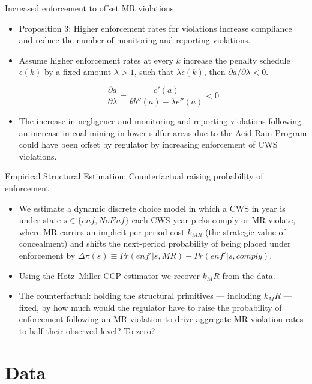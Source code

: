 \documentclass{beamer}
\begin{document}
\begin{frame}{Increased enforcement to offset MR violations}
\begin{itemize}
\item Proposition 3: Higher enforcement rates for violations increase compliance and reduce the number of monitoring and reporting violations. 
\item Assume higher enforcement rates at every $k$ increase the penalty schedule $\epsilon(k)$ by a fixed amount $\lambda>1$, such that $\lambda\epsilon(k)$, then $\partial a/\partial \lambda<0$.

\[\frac{\partial a}{\partial \lambda}=\frac{e'(a)}{\theta b''(a)-\lambda e''(a)}<0\]

\item The increase in negligence and monitoring and reporting violations following an increase in coal mining in lower sulfur areas due to the Acid Rain Program could have been offset by regulator by increasing enforcement of CWS violations.
\end{itemize}
\end{frame}

\begin{frame}{Empirical Structural Estimation: Counterfactual raising probability of enforcement}
\begin{itemize}
\item We estimate a dynamic discrete choice model in which a CWS in year is under state $s\in \{enf,NoEnf\}$ each CWS-year picks comply or MR-violate, where MR carries an implicit per-period cost $k_{MR}$ (the strategic value of concealment) and shifts the next-period probability of being placed under enforcement by $\Delta \pi(s) \equiv Pr(enf' | s, MR) - Pr(enf' | s, comply)$. 
\item Using the Hotz–Miller CCP estimator we recover $k_MR$ from the data. 
\item The counterfactual: holding the structural primitives — including $k_MR$ — fixed, by how much would the regulator have to raise the probability of enforcement following an MR violation to drive aggregate MR violation rates to half their observed level? To zero?
\end{itemize}
\end{frame}


\section{Data}
\end{document}

